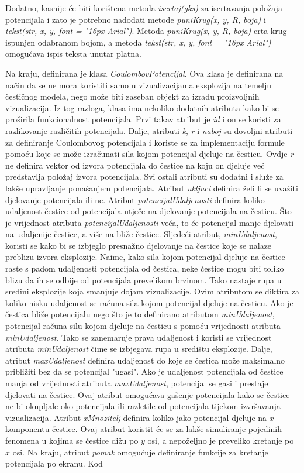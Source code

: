 \documentclass{foi}
\begin{document}
Dodatno, kasnije će biti korištena metoda \textit{iscrtaj(gks)} za iscrtavanja položaja potencijala i zato je potrebno nadodati metode \textit{puniKrug(x, y, R, boja)} i \textit{tekst(str, x, y, font = "16px Arial")}. Metoda \textit{puniKrug(x, y, R, boja)} crta krug ispunjen odabranom bojom, a metoda \textit{tekst(str, x, y, font = "16px Arial")} omogućava ispis teksta unutar platna.

Na kraju, definirana je klasa \textit{CoulombovPotencijal}. Ova klasa je definirana na način da se ne mora koristiti samo u vizualizacijama eksplozija na temelju čestičnog modela, nego može biti zaseban objekt za izradu proizvoljnih vizualizacija. Iz tog razloga, klasa ima nekoliko dodatnih atributa kako bi se proširila funkcionalnost potencijala. Prvi takav atribut je \textit{id} i on se koristi za razlikovanje različitih potencijala. Dalje, atributi \textit{k}, \textit{r} i \textit{naboj} su dovoljni atributi za definiranje Coulombovog potencijala i koriste se za implementaciju formule pomoću koje se može izračunati sila kojom potencijal djeluje na česticu. Ovdje \textit{r} ne definira vektor od izvora potencijala do čestice na koju on djeluje već predstavlja položaj izvora potencijala. Svi ostali atributi su dodatni i služe za lakše upravljanje ponašanjem potencijala. Atribut \textit{ukljuci} definira želi li se uvažiti djelovanje potencijala ili ne. Atribut \textit{potencijalUdaljenosti} definira koliko udaljenost čestice od potencijala utječe na djelovanje potencijala na česticu. Što je vrijednost atributa \textit{potencijalUdaljenosti} veća, to će potencijal manje djelovati na udaljenije čestice, a više na bliže čestice. Sljedeći atribut, \textit{minUdaljenost}, koristi se kako bi se izbjeglo presnažno djelovanje na čestice koje se nalaze preblizu izvora eksplozije. Naime, kako sila kojom potencijal djeluje na čestice raste s padom udaljenosti potencijala od čestica, neke čestice mogu biti toliko blizu da ih se odbije od potencijala prevelikom brzinom. Tako nastaje rupa u sredini eksplozije koja smanjuje dojam vizualizacije. Ovim atributom se diktira za koliko nisku udaljenost se računa sila kojom potencijal djeluje na česticu. Ako je čestica bliže potencijalu nego što je to definirano atributom \textit{minUdaljenost}, potencijal računa silu kojom djeluje na česticu s pomoću vrijednosti atributa \textit{minUdaljenost}. Tako se zanemaruje prava udaljenost i koristi se vrijednost atributa \textit{minUdaljenost} čime se izbjegava rupa u središtu eksplozije. Dalje, atribut \textit{maxUdaljenost} definira udaljenost do koje se čestica može maksimalno približiti bez da se potencijal "ugasi". Ako je udaljenost potencijala od čestice manja od vrijednosti atributa \textit{maxUdaljenost}, potencijal se gasi i prestaje djelovati na čestice. Ovaj atribut omogućava gašenje potencijala kako se čestice ne bi okupljale oko potencijala ili razletile od potencijala tijekom izvršavanja vizualizacija. Atribut \textit{xMnozitelj} definira koliko jako potencijal djeluje na $x$ komponentu čestice. Ovaj atribut koristit će se za lakše simuliranje pojedinih fenomena u kojima se čestice dižu po $y$ osi, a nepoželjno je preveliko kretanje po $x$ osi. Na kraju, atribut \textit{pomak} omogućuje definiranje funkcije za kretanje potencijala po ekranu. Kod 
\end{document}
